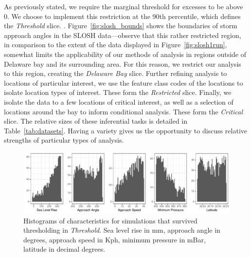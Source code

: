 As previously stated, we require the marginal threshold for excesses to be above 0.  We choose
    to implement this restriction at the 90th percentile, which defines the \emph{Threshold} slice.
    .  Figure~\ref{fig:slosh_bounds} shows the boundaries of 
    storm approach angles in the SLOSH data---observe that this rather restricted region, 
    in comparison to the extent of the data displayed in Figure~\ref{fig:slosh1run},
    somewhat limits the applicability of our methods of analysis in regions outside
    of Delaware bay and its surrounding area.  For this reason, we restrict our analysis
    to this region, creating the \emph{Delaware Bay} slice.  Further refining analysis to locations 
    of particular interest, we use the feature class codes of the locations to isolate location types
     of interest.  These form the \emph{Restricted} slice.
    Finally, we isolate the data to a few locations of critical interest, as well as a selection of
    locations around the bay to inform conditional analysis.  These form the \emph{Critical} slice.
    The relative sizes of these inferential tasks is detailed in Table~\ref{tab:datasets}.  Having
    a variety gives us the opportunity to discuss relative strengths of particular types of analysis.

\begin{figure}[htb]
    \centering 
    \caption{Histograms of characteristics for simulations that survived thresholding in \emph{Threshold}.
        Sea level rise in mm, approach angle in degrees, approach speed in Kph, minimum pressure in mBar,
        latitude in decimal degrees. 
        \label{fig:thetahistogram}}
    \includegraphics[width=0.9\linewidth]{plots/threshold_histogram}
\end{figure}

